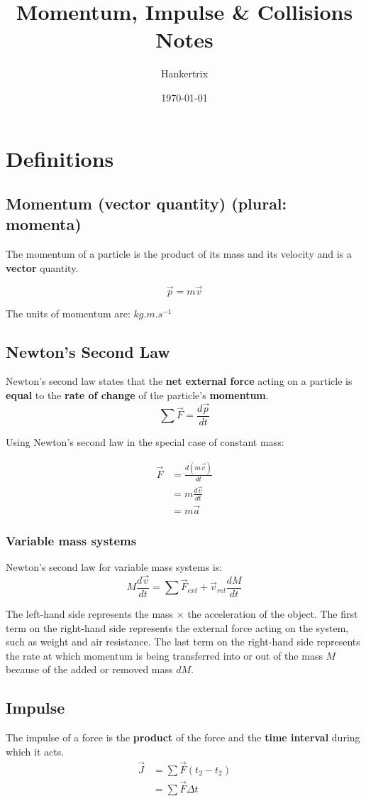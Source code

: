 \documentclass[11pt]{article}
\author{Hankertrix}
\date{\today}
\title{Momentum, Impulse \& Collisions Notes}
\begin{document}
\maketitle
\setcounter{tocdepth}{2}
\tableofcontents \clearpage\section{Definitions}
\label{sec:orgf516900}

\subsection{Momentum (vector quantity) (plural: momenta)}
\label{sec:orgdb818d6}
The momentum of a particle is the product of its mass and its velocity and is a \textbf{vector} quantity.

\[\vec{p} = m \vec{v}\]

The units of momentum are: \(\unit{kg.m.s^{-1}}\)
\subsection{Newton's Second Law}
\label{sec:orgd9da16f}
Newton's second law states that the \textbf{net external force} acting on a particle is \textbf{equal} to the \textbf{rate of change} of the particle's \textbf{momentum}.
\[\sum \vec{F} = \frac{d \vec{p}}{dt}\]

Using Newton's second law in the special case of constant mass:

\begin{align*}
\vec{F} &= \frac{d(m \vec{v})}{dt} \\
&= m \frac{d \vec{v}}{dt} \\
&= m \vec{a}
\end{align*}
\subsubsection{Variable mass systems}
\label{sec:org76d91c4}
Newton's second law for variable mass systems is:
\[M \frac{d \vec{v}}{dt} = \sum \vec{F}_{ext} + \vec{v}_{rel} \frac{dM}{dt}\]

The left-hand side represents the mass \(\times\) the acceleration of the object. The first term on the right-hand side represents the external force acting on the system, such as weight and air resistance. The last term on the right-hand side represents the rate at which momentum is being transferred into or out of the mass \(M\) because of the added or removed mass \(dM\).
\subsection{Impulse}
\label{sec:org35d0eee}
The impulse of a force is the \textbf{product} of the force and the \textbf{time interval} during which it acts.
\begin{align*}
\vec{J} &= \sum \vec{F} (t_2 - t_2) \\
&= \sum \vec{F} \Delta t
\end{align*}
\end{document}
